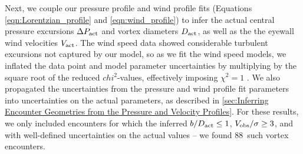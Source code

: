 \documentclass{aastex63}
\newcommand{\boverDactltone}{88}
\begin{document}


Next, we couple our pressure profile and wind profile fits (Equations \ref{eqn:Lorentzian_profile} and \ref{eqn:wind_profile}) to infer the actual central pressure excursions $\Delta P_{\rm act}$ and vortex diameters $D_{\rm act}$, as well as the the eyewall wind velocities $V_{\rm act}$. The wind speed data showed considerable turbulent excursions not captured by our model, so as we fit the wind speed models, we inflated the data point and model parameter uncertainties by multiplying by the square root of the reduced $chi^2$-values, effectively imposing $\chi^2 = 1$ \citep[cf.][]{Press2007}. We also propagated the uncertainties from the pressure and wind profile fit parameters into uncertainties on the actual parameters, as described in \ref{sec:Inferring Encounter Geometries from the Pressure and Velocity Profiles}. For these results, we only included encounters for which the inferred $b/D_{\rm act} \leq 1$, $V_{\rm obs}/\sigma \geq 3$, and with well-defined uncertainties on the actual values -- we found \boverDactltone\ such vortex encounters. 
\end{document}
